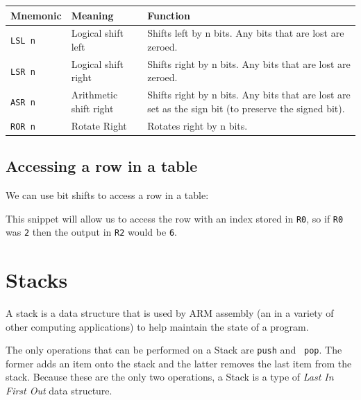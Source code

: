 \begin{center}
	\begin{tabularx}{\textwidth}{|l|X|X|}
		\hline
		{\bf Mnemonic} & {\bf Meaning} & {\bf Function}\\ \hline

		{\tt LSL n} & Logical shift left & Shifts left by n bits. Any bits that
		are lost are zeroed.\\ \hline

		{\tt LSR n} & Logical shift right &  Shifts right by n bits. Any bits
		that are lost are zeroed.\\ \hline

		{\tt ASR n} & Arithmetic shift right & Shifts right by n bits. Any bits
		that are lost are set as the sign bit (to preserve the signed bit).\\
		\hline

		{\tt ROR n} & Rotate Right & Rotates right by n bits.\\ \hline
	\end{tabularx}
\end{center}

\subsection{Accessing a row in a table}

We can use bit shifts to access a row in a table:


This snippet will allow us to access the row with an index stored in {\tt R0},
so if {\tt R0} was {\tt 2} then the output in {\tt R2} would be {\tt 6}.

\section{Stacks}


A stack is a data structure that is used by ARM assembly (an in a variety of
other computing applications) to help maintain the state of a program.

The only operations that can be performed on a Stack are {\tt push} and {\tt
pop}. The former adds an item onto the stack and the latter removes the last
item from the stack. Because these are the only two operations, a Stack is a
type of {\it Last In First Out} data structure.

